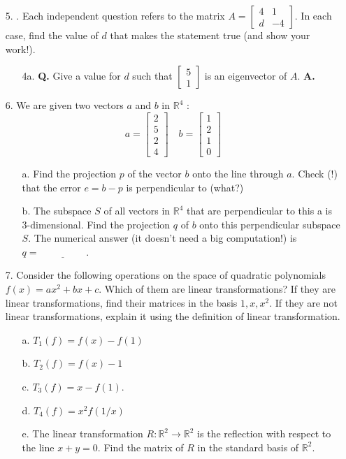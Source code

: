 \documentclass[main.tex]{subfiles}
\begin{document}
\begin{enumerate}
\item[5.] . Each independent question refers to the matrix $A=\left[\begin{array}{cc}4 & 1 \\ d & -4\end{array}\right]$. In each case, find the value of $d$ that makes the statement true (and show your work!).
\begin{enumerate}
    \item [4a.] \textbf{Q.} Give a value for $d$ such that $\left[\begin{array}{l}5 \\ 1\end{array}\right]$ is an eigenvector of $A$. \textbf{A.}
\end{enumerate}

\item[6.] We are given two vectors $a$ and $b$ in $\mathbb{R}^{4}$ :
$$
a=\left[\begin{array}{l}
2 \\
5 \\
2 \\
4
\end{array}\right] \quad b=\left[\begin{array}{l}
1 \\
2 \\
1 \\
0
\end{array}\right]
$$
\begin{enumerate}
    \item [a.] Find the projection $p$ of the vector $b$ onto the line through $a$. Check (!) that the error $e=b-p$ is perpendicular to (what?)
    \item [b.] The subspace $S$ of all vectors in $\mathbb{R}^{4}$ that are perpendicular to this a is 3-dimensional. Find the projection $q$ of $b$ onto this perpendicular subspace $S$. The numerical answer (it doesn't need a big computation!) is $q=\underline{\hspace{2cm}}$.
\end{enumerate} 

\item[7.] Consider the following operations on the space of quadratic polynomials $f(x)=a x^{2}+b x+c$. Which of them are linear transformations? If they are linear transformations, find their matrices in the basis $1, x, x^{2}$. If they are not linear transformations, explain it using the definition of linear transformation.
    \begin{enumerate}
    \item [a.] $T_{1}(f)=f(x)-f(1)$
    \item [b.] $T_{2}(f)=f(x)-1$
    \item [c.] $T_{3}(f)=x-f(1)$.
    \item [d.] $T_{4}(f)=x^{2} f(1 / x)$
    \item [e.] The linear transformation $R: \mathbb{R}^{2} \longrightarrow \mathbb{R}^{2}$ is the reflection with respect to the line $x+y=0$. Find the matrix of $R$ in the standard basis of $\mathbb{R}^{2}$.
    \end{enumerate}

\end{enumerate}
\end{document}
